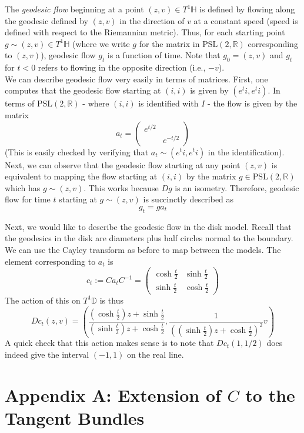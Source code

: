 \documentclass[]{article}
\begin{document}
The \textit{geodesic flow} beginning at a point $(z, v) \in T^1\mathbb{H}$ is defined by flowing along the geodesic defined by $(z, v)$ in the direction of $v$ at a constant speed (speed is defined with respect to the Riemannian metric).
Thus, for each starting point $g \sim (z, v) \in T^1\mathbb{H}$ (where we write $g$ for the matrix in $\text{PSL}(2, \mathbb{R})$ corresponding to $(z, v)$), geodesic flow $g_t$ is a function of time.
Note that $g_0 = (z, v)$ and $g_t$ for $t < 0$ refers to flowing in the opposite direction (i.e., $-v$).
\\

We can describe geodesic flow very easily in terms of matrices.
First, one computes that the geodesic flow starting at $(i, i)$ is given by $(e^ti, e^ti)$.
In terms of $\text{PSL}(2, \mathbb{R})$ - where $(i, i)$ is identified with $I$ - the flow is given by the matrix
$$
a_t =
\begin{pmatrix}
e^{t/2} & ~ \\
~ & e^{-t/2}
\end{pmatrix}
$$
(This is easily checked by verifying that $a_t \sim (e^ti, e^ti)$ in the identification).
Next, we can observe that the geodesic flow starting at any point $(z, v)$ is equivalent to mapping the flow starting at $(i, i)$ by the matrix $g \in \text{PSL}(2, \mathbb{R})$ which has $g \sim (z, v)$.
This works because $Dg$ is an isometry.
Therefore, geodesic flow for time $t$ starting at $g \sim (z, v)$ is succinctly described as
$$
g_t = ga_t
$$

Next, we would like to describe the geodesic flow in the disk model.
Recall that the geodesics in the disk are diameters plus half circles normal to the boundary.
We can use the Cayley transform as before to map between the models.
The element corresponding to $a_t$ is
$$
c_t := Ca_tC^{-1} =
\begin{pmatrix}
\cosh\frac{t}{2} & \sinh\frac{t}{2} \\
\sinh\frac{t}{2} & \cosh\frac{t}{2}
\end{pmatrix}
$$
The action of this on $T^1\mathbb{D}$ is thus
$$
Dc_t(z, v) = \left( \frac{\left( \cosh\frac{t}{2} \right)z + \sinh\frac{t}{2}}{\left( \sinh\frac{t}{2} \right)z + \cosh\frac{t}{2}}, \frac{1}{\left( \left( \sinh\frac{t}{2} \right)z + \cosh\frac{t}{2} \right)^2}v \right)
$$
A quick check that this action makes sense is to note that $Dc_t(1, 1/2)$ does indeed give the interval $(-1, 1)$ on the real line.

\section*{Appendix A: Extension of $C$ to the Tangent Bundles}
\end{document}
